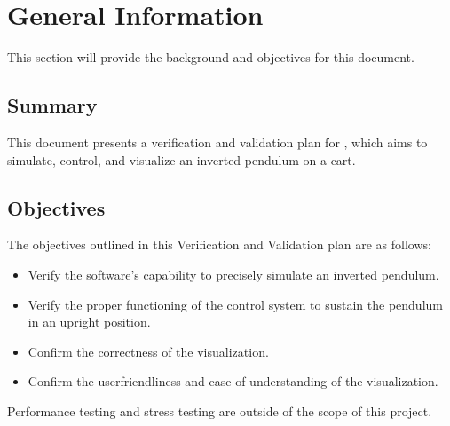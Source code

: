 \documentclass[12pt, titlepage]{article}
\begin{document}
\section{General Information}
This section will provide the background and objectives for this document.

\subsection{Summary}

This document presents a verification and validation plan for \progname{}, 
which aims to simulate, control, and visualize an inverted pendulum on a cart.


\subsection{Objectives}

The objectives outlined in this Verification and Validation plan are as follows:

\begin{itemize}
    \item Verify the software's capability to precisely simulate an 
          inverted pendulum.
    \item Verify the proper functioning of the control system to sustain
          the pendulum in an upright position.
    \item Confirm the correctness of the visualization.
    \item Confirm the userfriendliness and ease of understanding of the 
          visualization.
\end{itemize}

Performance testing and stress testing are outside of the scope of this project.


\end{document}
